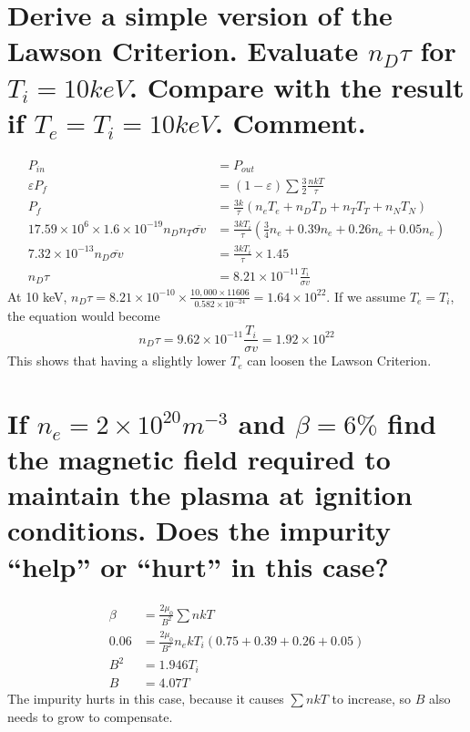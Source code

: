 \documentclass[answers]{exam}
\begin{document}
\begin{questions}
\begin{parts}
\part{Derive a simple version of the Lawson Criterion. Evaluate $n_D\tau$ for $T_i = 10 \unit{keV}$. Compare with the result if $T_e = T_i = 10 \unit{keV}$. Comment.}

\begin{solution}
    \begin{align*}
        P_{in} &= P_{out} \\
        \varepsilon P_f &= (1 - \varepsilon) \sum \frac{3}{2} \frac{nkT}{\tau} \\
        P_f &= \frac{3k}{\tau} \left(n_eT_e + n_DT_D + n_TT_T + n_NT_N\right) \\
        17.59 \times 10^6 \times 1.6 \times 10^{-19} n_Dn_T \overline{\sigma v} &= \frac{3kT_i}{\tau} \left(\frac{3}{4} n_e + 0.39n_e + 0.26n_e + 0.05n_e\right) \\
        7.32 \times 10^{-13} n_D \overline{\sigma v} &= \frac{3kT_i}{\tau} \times 1.45 \\
        n_D\tau &= 8.21 \times 10^{-11} \frac{T_i}{\sigma v}
    \end{align*}
    At 10 keV, $n_D\tau = 8.21 \times 10^{-10} \times \frac{10,000 \times 11606}{0.582 \times 10^{-24}} = 1.64 \times 10^{22}$. If we assume $T_e = T_i$, the equation would become
    $$n_D\tau = 9.62 \times 10^{-11} \frac{T_i}{\sigma v} = 1.92 \times 10^{22}$$
    This shows that having a slightly lower $T_e$ can loosen the Lawson Criterion.
\end{solution}

\part{If $n_e = 2 \times 10^{20} \unit{m^{-3}}$ and $\beta = 6\%$ find the magnetic field required to maintain the plasma at ignition conditions. Does the impurity “help” or “hurt” in this case?}

\begin{solution}
    \begin{align*}
        \beta &= \frac{2\mu_0}{B^2} \sum nkT \\
        0.06 &= \frac{2\mu_0}{B^2} n_ekT_i (0.75 + 0.39 + 0.26 + 0.05) \\
        B^2 &= 1.946T_i \\
        B &= 4.07\unit{T}
    \end{align*}
    The impurity hurts in this case, because it causes $\sum nkT$ to increase, so $B$ also needs to grow to compensate.
\end{solution}


\end{parts}
\end{questions}
\end{document}
